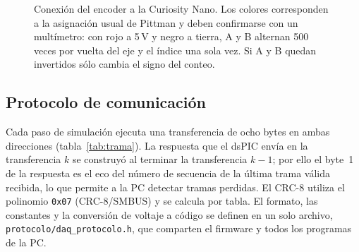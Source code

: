 \documentclass[11pt]{article}
\newcommand{\code}[1]{\texttt{#1}}
\begin{document}
\begin{figure}[H]
\caption{Conexión del encoder a la Curiosity Nano. Los colores corresponden a
la asignación usual de Pittman y deben confirmarse con un multímetro: con
rojo a 5\,V y negro a tierra, A y B alternan 500 veces por vuelta del eje y el
índice una sola vez. Si A y B quedan invertidos sólo cambia el signo del
conteo.}
\label{fig:encoder}
\end{figure}

\subsection{Protocolo de comunicación}

Cada paso de simulación ejecuta una transferencia de ocho bytes en ambas
direcciones (tabla~\ref{tab:trama}). La respuesta que el dsPIC envía en la
transferencia $k$ se construyó al terminar la transferencia $k-1$; por ello
el byte~1 de la respuesta es el eco del número de secuencia de la última
trama válida recibida, lo que permite a la PC detectar tramas perdidas. El
CRC-8 utiliza el polinomio \code{0x07} (CRC-8/SMBUS) y se calcula por tabla.
El formato, las constantes y la conversión de voltaje a código se definen en
un solo archivo, \code{protocolo/daq\_protocolo.h}, que comparten el firmware
y todos los programas de la PC.
\end{document}
